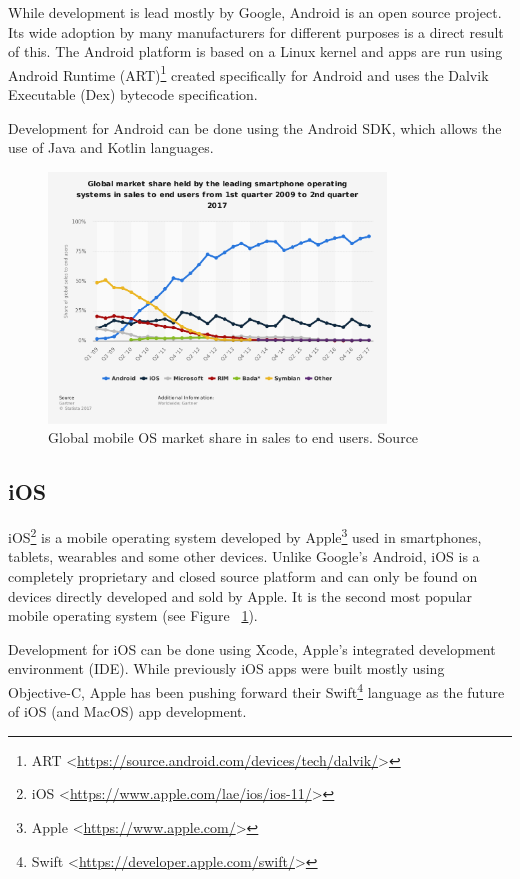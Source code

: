 While development is lead mostly by Google, Android is an open source project. Its wide adoption by many manufacturers for different purposes is a direct result of this. The Android platform is based on a Linux kernel and apps are run using Android Runtime (ART)\footnote{ART <\url{https://source.android.com/devices/tech/dalvik/}>} created specifically for Android and uses the Dalvik Executable (Dex) bytecode specification. 

Development for Android can be done using the Android SDK, which allows the use of Java and Kotlin languages.

\begin{figure}[!ht]
	\centering
	\includegraphics[width=0.8\textwidth]{figures/02_analysis/mobile-market}
    \caption{Global mobile OS market share in sales to end users. Source\cite{statista-mobile-share}}
    \label{fig:statista-mobile-market}
\end{figure}

\subsection{iOS}
iOS\footnote{iOS <\url{https://www.apple.com/lae/ios/ios-11/}>} is a mobile operating system developed by Apple\footnote{Apple <\url{https://www.apple.com/}>} used in smartphones, tablets, wearables and some other devices. Unlike Google's Android, iOS is a completely proprietary and closed source platform and can only be found on devices directly developed and sold by Apple. It is the second most popular mobile operating system (see Figure ~\ref{fig:statista-mobile-market}).

Development for iOS can be done using Xcode, Apple’s integrated development environment (IDE). While previously iOS apps were built mostly using Objective-C, Apple has been pushing forward their Swift\footnote{Swift <\url{https://developer.apple.com/swift/}>} language as the future of iOS (and MacOS) app development.

